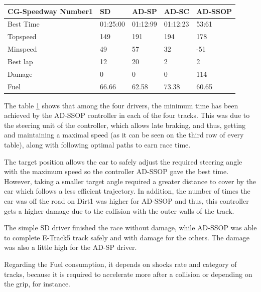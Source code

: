 \documentclass[runningheads,a4paper]{llncs}
\begin{document}
\begin{table}[h!]
{\begin{tabular}{ |p{3.5cm}|p{2cm}|p{2cm}|p{2 cm}|p{2 cm}|}
				\\
				\hline
				\hline
				{ \color{blue}\textbf{CG-Speedway Number1} }&
				{ \color{red}\textbf{SD}}&  
				{ \color{red} \textbf{AD-SP} } &
				{ \color{red} \textbf{AD-SC} } &
				{ \color{red} \textbf{AD-SSOP} }
				\\
				\hline
				Best Time & 01:25:00  & 01:12:99 & 01:12:23& 53:61 
				\\
				\hline
				Topspeed & 149  & 191& 194 & 178 
				\\
				\hline
				Minspeed & 49 & 57 & 32 & -51 
				\\
				\hline 
				Best lap & 12 & 20 & 2 & 2  
				\\
				\hline
				Damage & 0 & 0 & 0 &  114 
				\\
				\hline 
				Fuel & 66.66 & 62.58 & 73.38 & 60.65 
				\\
				\hline
			\end{tabular} 
		}
		\label{Result1r}
	\end{table}
	
	The table \ref{Result1r} shows that among the four drivers, the
	minimum time has been achieved by the AD-SSOP controller in each of the
	four tracks. This was due to the steering unit of the controller, which allows late braking, and thus, getting and maintaining a maximal speed (as it can be seen on the third  row of every table), along with following optimal paths to earn race time.
	
	The target position allows the car to safely adjust the required steering angle with the maximum speed so the controller AD-SSOP gave the best time. However, taking a smaller target angle required a greater distance to
	cover by the car which follows a less efficient trajectory. In addition, the
	number of times the car was off the road on Dirt1  was higher
	for AD-SSOP and thus, this controller gets a higher damage due to the collision with the outer walls of the track. 
	
	The simple SD driver finished the race without damage, while AD-SSOP was able to complete E-Track5  track safely and with damage for the others. The damage was also a little high for the AD-SP driver. 
	
	Regarding the Fuel consumption, it  depends on shocks rate and category of tracks, because it is required to accelerate more after a collision or depending on the grip, for instance.  
	
\end{document}
